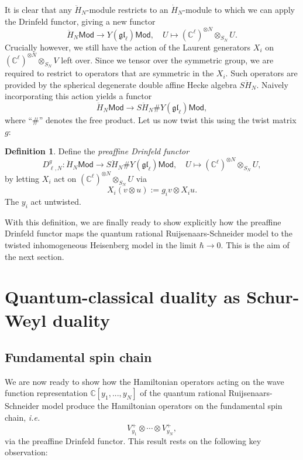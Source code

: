 \documentclass[11pt]{report}
\theoremstyle{definition}
\newtheorem{definition}[theorem]{Definition}
\theoremstyle{remark}
\theoremstyle{remark}
\newcommand{\C}{\mathbb{C}}
\begin{document}
It is clear that any $\ddot H_N$-module restricts to an $\dot H_N$-module to which we can apply the Drinfeld functor, giving a new functor
\begin{equation*}
\ddot H_N\mathsf{Mod} \to Y(\mathfrak{gl}_\ell)\mathsf{Mod}, \quad U \mapsto (\C^\ell)^{\otimes N} \otimes_{S_N} U.
\end{equation*}
Crucially however, we still have the action of the Laurent generators $X_i$ on $(\C^\ell)^{\otimes N} \otimes_{S_N} V$ left over. Since we tensor over the symmetric group, we are required to restrict to operators that are symmetric in the $X_i$. Such operators are provided by the spherical degenerate double affine Hecke algebra $S\ddot H_N$. Naively incorporating this action yields a functor
\begin{equation*}
\ddot H_N\mathsf{Mod} \to S\ddot H_N \# Y(\mathfrak{gl}_\ell)\mathsf{Mod},
\end{equation*}
where “$\#$” denotes the free product. Let us now twist this using the twist matrix $g$:

\begin{definition}
Define the \emph{preaffine Drinfeld functor}
\begin{equation*}
D_{\ell,N}^g: \ddot H_N\mathsf{Mod} \to S\ddot H_N \# Y(\mathfrak{gl}_\ell)\mathsf{Mod}, \quad U \mapsto (\C^\ell)^{\otimes N} \otimes_{S_N} U,
\end{equation*}
by letting $X_i$ act on $(\C^\ell)^{\otimes N} \otimes_{S_N} U$ via
\begin{equation*}
X_i(v \otimes u) := g_i v \otimes X_i u.
\end{equation*}
The $y_i$ act untwisted.
\end{definition}

With this definition, we are finally ready to show explicitly how the preaffine Drinfeld functor maps the quantum rational Ruijsenaars-Schneider model to the twisted inhomogeneous Heisenberg model in the limit $\hbar \to 0$. This is the aim of the next section.

\section{Quantum-classical duality as Schur-Weyl duality}

\subsection{Fundamental spin chain}

We are now ready to show how the Hamiltonian operators acting on the wave function representation $\C[y_1,...,y_N]$ of the quantum rational Ruijsenaars-Schneider model produce the Hamiltonian operators on the fundamental spin chain, \emph{i.e.}
\begin{equation*}
V_{y_1}^+ \otimes \cdots \otimes V_{y_N}^+,
\end{equation*}
via the preaffine Drinfeld functor. This result rests on the following key observation:
\end{document}
